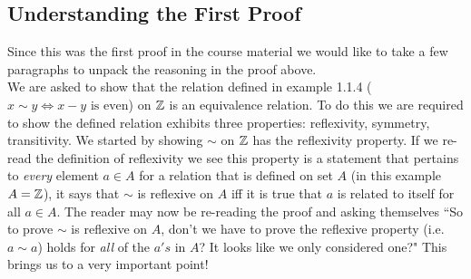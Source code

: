 \subsection{Understanding the First Proof}
Since this was the first proof in the course material we would like to take a few paragraphs to unpack the reasoning in the proof above. \steezybreak\\
\noindent We are asked to show that the relation defined in example 1.1.4 ($x\sim y \iff x-y \text{ is even}$) on ${\mathbb{ Z}}$ is an equivalence relation. To do this we are required to show the defined relation exhibits three properties: reflexivity, symmetry, transitivity. We started by showing $\sim$ on ${\mathbb{ Z}}$ has the reflexivity property. If we re-read the definition of reflexivity we see this property is a statement that pertains to \textit{every} element $a\in A$ for a relation that is defined on set $A$ (in this example $A={\mathbb{ Z}}$), it says that $\sim$ is reflexive on $A$ iff it is true that $a$ is related to itself for all $a\in A$. The reader may now be re-reading the proof and asking themselves ``So to prove $\sim$ is reflexive on $A$, don't we have to prove the reflexive property (i.e. $a\sim a$) holds for \textit{all} of the $a's$ in $A$? It looks like we only considered one?" This brings us to a very important point! \steezybreak\\

